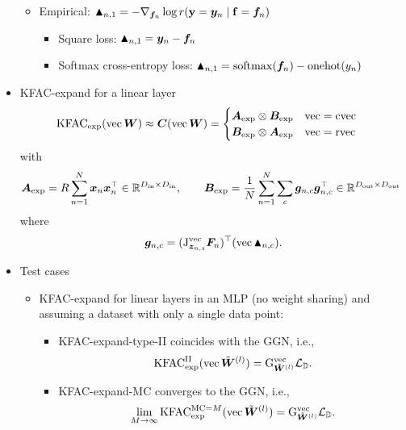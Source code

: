 \begin{itemize}
\begin{itemize}
    \item Empirical: $\blacktriangle_{n,1} = - \nabla_{{\bm{f}}_n} \log r({\mathbf{y}} = {\bm{y}}_n \mid {\mathbf{f}} = {\bm{f}}_n)$
      \begin{itemize}
      \item Square loss: $\blacktriangle_{n,1} = {\bm{y}}_n - {\bm{f}}_n$
      \item Softmax cross-entropy loss: $\blacktriangle_{n,1} = \mathrm{softmax}({\bm{f}}_n) - \mathrm{onehot}(y_n)$
      \end{itemize}
    \end{itemize}
  \item KFAC-expand for a linear layer
    \begin{align*}
      &\mathrm{KFAC}_{\text{exp}}(\operatorname{vec} {\bm{W}}) \approx {\bm{C}}(\operatorname{vec} {\bm{W}})
      =
        \begin{cases}
          {\bm{A}}_{\text{exp}} \otimes {\bm{B}}_{\text{exp}} & \operatorname{vec} = \operatorname{cvec}
          \\
          {\bm{B}}_{\text{exp}} \otimes {\bm{A}}_{\text{exp}} & \operatorname{vec} = \operatorname{rvec}
        \end{cases}\,
    \end{align*}
    with
    \begin{align*} 
      {\bm{A}}_{\text{exp}} = R \sum_{n=1}^N {\bm{x}}_{n} {\bm{x}}_{n}^{\top} \in {\mathbb{R}}^{D_{\text{in}} \times D_{\text{in}}}, \qquad
      {\bm{B}}_{\text{exp}} &= \frac{1}{N}\sum_{n=1}^N \sum_c {\bm{g}}_{n,c} {\bm{g}}_{n,c}^{\top}  \in {\mathbb{R}}^{D_{\text{out}} \times D_{\text{out}}}
    \end{align*}
    where
    \begin{align*}
    {\bm{g}}_{n,c} = (\mathrm{J}_{{\bm{z}}_{n,s}}^{\operatorname{vec}}{\bm{F}}_n)^{\top} (\operatorname{vec} \blacktriangle_{n,c}).
    \end{align*}
  \item Test cases
    \begin{itemize}
      \item KFAC-expand for linear layers in an MLP (no weight sharing) and assuming a dataset with only a single data point:
        \begin{itemize}
          \item KFAC-expand-type-II coincides with the GGN, i.e.,
            \begin{align*}
              \mathrm{KFAC}^{\text{II}}_{\text{exp}}(\operatorname{vec}\tilde{{\bm{W}}}^{(l)}) = \mathrm{G}^{\operatorname{vec}}_{\tilde{{\bm{W}}}^{(l)}}{\mathcal{L}}_{{\mathbb{D}}}.
            \end{align*}
          \item KFAC-expand-MC converges to the GGN, i.e.,
            \begin{align*}
              \lim_{M \to \infty} \kfac^{\text{MC}=M}_{\text{exp}}(\vec\tilde{\mW}^{(l)}) = \ggn^{\vec}_{\tilde{\mW}^{(l)}}\gL_{\sD}.

\end{align*}
\end{itemize}
\end{itemize}
\end{itemize}
